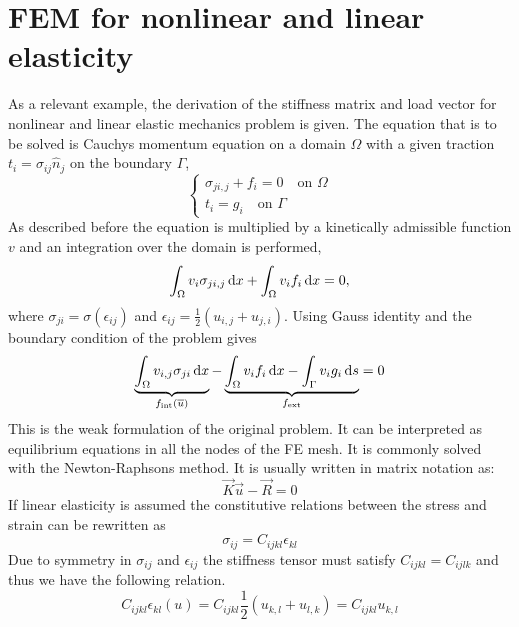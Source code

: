 \documentclass[fem.tex]{subfiles}
\begin{document}
\section{FEM for nonlinear and linear elasticity}
\label{sec:femmech}
As a relevant example, the derivation of the stiffness matrix and load vector for nonlinear and linear elastic mechanics problem is given. The equation that is to be solved is Cauchys momentum equation on a domain $\Omega$ with a given traction $t_i = \sigma_{ij} \hat{n}_j$ on the boundary $\Gamma$,
\begin{equation} 
\left\{
\begin{array}{ll}
   \sigma_{ji,j} + f_i = 0 \quad \text{on } \Omega \\
   t_i = g_i \quad \text{on } \Gamma \end{array} \right.
\end{equation}
%
As described before the equation is multiplied by a kinetically admissible function $v$ and an integration over the domain is performed,
%
\begin{equation} 
  \int_\Omega  v_i\sigma_{ji,j} \, \mathrm{d} x + \int_\Omega v_i f_i \, \mathrm{d} x = 0, 
\end{equation}
%
where $\sigma_{ji} = \sigma(\epsilon_{ij})$ and $\epsilon_{ij} = \frac{1}{2}\left(u_{i,j} + u_{j,i} \right)$. Using Gauss identity and the boundary condition of the problem gives
%
\begin{equation} 
  \underbrace{\int_\Omega  v_{i,j} \sigma_{ji} \, \mathrm{d} x}_{f_\text{int}(\overline{u})} - \underbrace{\int_\Omega v_i f_i \, \mathrm{d} x - \int_\Gamma v_i g_i \, \mathrm{d} s}_{f_\text{ext}} = 0
    \label{eqn:weak}
\end{equation}
%
 This is the weak formulation of the original problem. It can be interpreted as equilibrium equations in all the nodes of the FE mesh. It is commonly solved with the Newton-Raphsons method. It is usually written in matrix notation as:
 \begin{equation} 
 \vec{K}\vec{u} - \vec{R} = 0
\end{equation}
 If linear elasticity is assumed the constitutive relations between the stress and strain can be rewritten as
%
\begin{equation}
\label{eqn:const} 
\sigma_{ij} = C_{ijkl} \epsilon_{kl}
\end{equation}
%
Due to symmetry in $\sigma_{ij}$ and $\epsilon_{ij}$ the stiffness tensor must satisfy $C_{ijkl} = C_{ijlk}$ and thus we have the following relation.
%
\begin{equation}
\label{eqn:symm}
 C_{ijkl}\epsilon_{kl} (u) = C_{ijkl}\frac{1}{2} \left(u_{k,l} + u_{l,k}\right) = C_{ijkl}u_{k,l} 
\end{equation}
\end{document}
